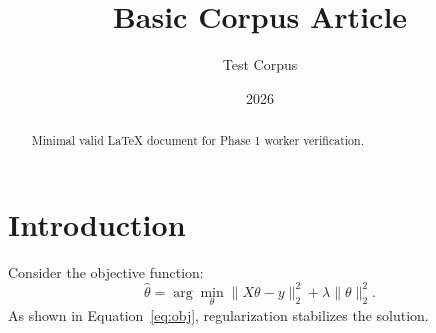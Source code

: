 \documentclass[11pt]{article}
\title{Basic Corpus Article}
\author{Test Corpus}
\date{2026}
\begin{document}
\maketitle

\begin{abstract}
Minimal valid LaTeX document for Phase 1 worker verification.
\end{abstract}

\section{Introduction}
Consider the objective function:
\begin{equation}\label{eq:obj}
    \hat{\theta} = \arg\min_{\theta} \| X\theta - y \|_2^2 + \lambda \|\theta\|_2^2.
\end{equation}
As shown in Equation~\eqref{eq:obj}, regularization stabilizes the solution.
\end{document}
